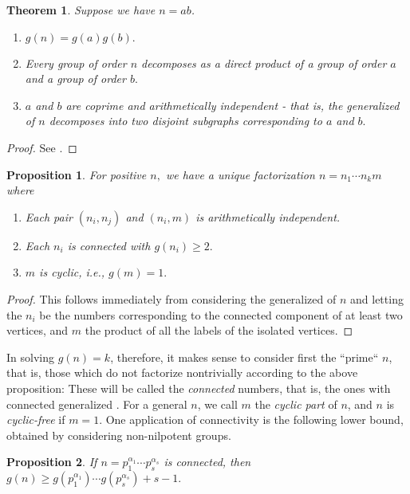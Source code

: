 \documentclass[draft]{article}
\newcommand{\ufdsh}{p_1^{\alpha_1} \cdots p_s^{\alpha_s}}
\theoremstyle{plain}
\newtheorem{thm}{Theorem}[section]
\newtheorem{prop}{Proposition}[section]
\theoremstyle{definition}
\begin{document}
\begin{thm}
	Suppose we have $n = ab$.
	\begin{enumerate}\listspace
		\item $g(n) = g(a)g(b).$
		\item Every group of order $n$ decomposes as a direct product of a group of order $a$ and a group of order $b.$
		\item $a$ and $b$ are coprime and arithmetically independent - that is, the generalized \hg[1] of $n$ decomposes into two disjoint subgraphs corresponding to $a$ and $b.$
	\end{enumerate} \textspace
\end{thm}
\begin{proof}
	See {\cite{monolith}}.
\end{proof}

\begin{prop}
	For positive $n,$ we have a unique factorization $n = n_1 \cdots n_k m$ where\pagebreak[3]
	\begin{enumerate} \listspace
		\item Each pair $(n_i, n_j)$ and $(n_i, m)$ is arithmetically independent.
		\item Each $n_i$ is connected with $g(n_i) \ge 2.$
		\item $m$ is cyclic, i.e., $g(m) = 1.$
	\end{enumerate} \textspace
\end{prop}
\begin{proof}
	This follows immediately from considering the generalized \hg[1] of $n$ and letting the $n_i$ be the numbers corresponding to the connected component of at least two vertices, and $m$ the product of all the labels of the isolated vertices.
\end{proof}

In solving $g(n) = k$, therefore, it makes sense to consider first the ``prime`` $n$, that is, those which do not factorize nontrivially according to the above proposition: These will be called the \emph{connected} numbers, that is, the ones with connected generalized \hg[1]. For a general $n$, we call $m$ the \emph{cyclic part} of $n$, and $n$ is \emph{cyclic-free} if $m = 1$. One application of connectivity is the following lower bound, obtained by considering non-nilpotent groups.

\begin{prop}
	If $n = \ufdsh$ is connected, then $g(n) \ge g(p_1^{\alpha_1})\cdots g(p_s^{\alpha_s}) + s - 1.$
\end{prop}
\end{document}
